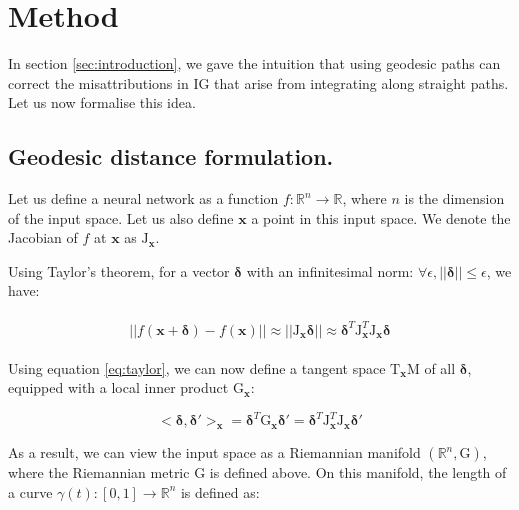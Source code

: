 \section{Method}
\label{sec:method}

In section \ref{sec:introduction}, we gave the intuition that using geodesic paths can correct the misattributions in IG that arise from integrating along straight paths. Let us now formalise this idea.

\subsection{Geodesic distance formulation.} Let us define a neural network as a function $f: \mathbb{R}^n \to \mathbb{R}$, where $n$ is the dimension of the input space. Let us also define $\textbf{x}$ a point in this input space. We denote the Jacobian of $f$ at $\textbf{x}$ as $\textrm{J}_{\textbf{x}}$.

Using Taylor's theorem, for a vector $\boldsymbol{\delta}$ with an infinitesimal norm: $\forall \epsilon, ||\boldsymbol{\delta}|| \le \epsilon$, we have:

\begin{align}
\begin{split}
    ||f(\textbf{x} + \boldsymbol{\delta}) - f(\textbf{x})|| \approx ||\textrm{J}_{\textbf{x}}\boldsymbol{\delta}|| \approx \boldsymbol{\delta}^T \textrm{J}_{\textbf{x}}^T \textrm{J}_{\textbf{x}} \boldsymbol{\delta}
\end{split}
\label{eq:taylor}
\end{align}

Using equation \ref{eq:taylor}, we can now define a tangent space $\textrm{T}_\textbf{x}\textrm{M}$ of all $\boldsymbol{\delta}$, equipped with a local inner product $\textrm{G}_\textbf{x}$:

\begin{equation}
    <\boldsymbol{\delta}, \boldsymbol{\delta'}>_\textbf{x} = \boldsymbol{\delta}^T \textrm{G}_\textbf{x} \boldsymbol{\delta'}
    = \boldsymbol{\delta}^T \textrm{J}_{\textbf{x}}^T \textrm{J}_{\textbf{x}}\boldsymbol{\delta'}
\label{eq:inner_product}
\end{equation}

As a result, we can view the input space as a Riemannian manifold $(\mathbb{R}^n, \textrm{G})$, where the Riemannian metric $\textrm{G}$ is defined above. On this manifold, the length of a curve $\gamma(t): [0, 1] \to \mathbb{R}^n$ is defined as:

